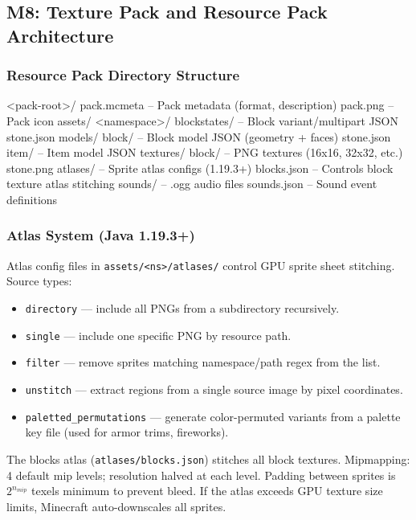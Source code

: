 \documentclass[11pt,letterpaper]{article}
\begin{document}
\subsection{M8: Texture Pack and Resource Pack Architecture}

\subsubsection{Resource Pack Directory Structure}

\begin{asciibox}
<pack-root>/
  pack.mcmeta              -- Pack metadata (format, description)
  pack.png                 -- Pack icon
  assets/
    <namespace>/
      blockstates/         -- Block variant/multipart JSON
        stone.json
      models/
        block/             -- Block model JSON (geometry + faces)
          stone.json
        item/              -- Item model JSON
      textures/
        block/             -- PNG textures (16x16, 32x32, etc.)
          stone.png
      atlases/             -- Sprite atlas configs (1.19.3+)
        blocks.json        -- Controls block texture atlas stitching
      sounds/              -- .ogg audio files
      sounds.json          -- Sound event definitions
\end{asciibox}

\subsubsection{Atlas System (Java 1.19.3+)}

Atlas config files in \texttt{assets/<ns>/atlases/} control GPU sprite sheet stitching. Source types:
\begin{itemize}[leftmargin=2em]
  \item \texttt{directory} --- include all PNGs from a subdirectory recursively.
  \item \texttt{single} --- include one specific PNG by resource path.
  \item \texttt{filter} --- remove sprites matching namespace/path regex from the list.
  \item \texttt{unstitch} --- extract regions from a single source image by pixel coordinates.
  \item \texttt{paletted\_permutations} --- generate color-permuted variants from a palette key file (used for armor trims, fireworks).
\end{itemize}

The blocks atlas (\texttt{atlases/blocks.json}) stitches all block textures. Mipmapping: 4 default mip levels; resolution halved at each level. Padding between sprites is $2^{n_{mip}}$ texels minimum to prevent bleed. If the atlas exceeds GPU texture size limits, Minecraft auto-downscales all sprites.
\end{document}
